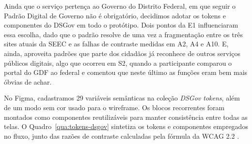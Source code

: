\documentclass[
  12pt,
  oneside,
  a4paper,
  chapter=TITLE,
  section=TITLE,
  english,
  brazilian
]{abntex2}
\begin{document}
Ainda que o serviço pertença ao Governo do Distrito Federal, em que seguir o
Padrão Digital de Governo \cite{dsgov} não é obrigatório, decidimos adotar os
tokens e componentes do DSGov em todo o protótipo. Dois pontos da E1 influenciaram
essa escolha, dado que o padrão resolve de uma vez a fragmentação entre os
três sites atuais da SEEC e as falhas de contraste medidas em A2, A4 e A10.
E, ainda, aproveita padrões que parte dos cidadãos já reconhece de outros
serviços públicos digitais, algo que ocorreu em S2, quando
a participante comparou o portal do GDF ao federal e comentou que neste último
as funções eram bem mais óbvias de achar.

No Figma, cadastramos 29 variáveis semânticas na coleção \textit{DSGov tokens}, além de um modo sem cor usado para o wireframe. Os blocos recorrentes
foram montados como componentes reutilizáveis para manter consistência entre
todas as telas. O Quadro~\ref{qua:tokens-dsgov} sintetiza os tokens e
componentes empregados no fluxo, junto das razões de contraste calculadas pela
fórmula da WCAG 2.2 \cite{wcag22}.
\end{document}
